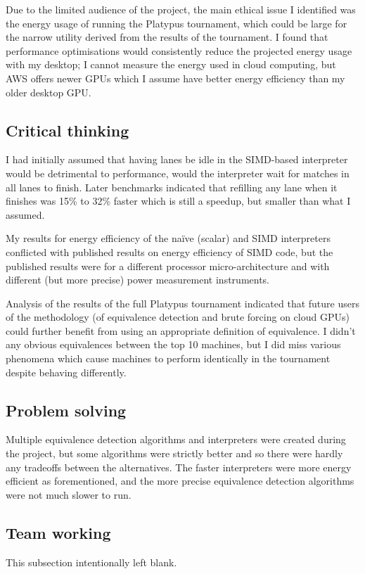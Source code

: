 \documentclass[a4paper]{article}
\begin{document}
Due to the limited audience of the project, the main ethical issue I
identified was the energy usage of running the Platypus tournament,
which could be large for the narrow utility derived from the results of the
tournament. I found that performance optimisations would consistently
reduce the projected energy usage with my desktop; I cannot measure the
energy used in cloud computing, but AWS offers newer GPUs which I assume
have better energy efficiency than my older desktop GPU.

\subsection{Critical thinking}

I had initially assumed that having lanes be idle in the SIMD-based
interpreter would be detrimental to performance, would the interpreter
wait for matches in all lanes to finish. Later benchmarks indicated that
refilling any lane when it finishes was 15\% to 32\% faster which is
still a speedup, but smaller than what I assumed.

My results for energy efficiency of the na\"ive (scalar) and SIMD interpreters
conflicted with published results on energy efficiency of SIMD code, but the
published results were for a different processor micro-architecture and with
different (but more precise) power measurement instruments.

Analysis of the results of the full Platypus tournament indicated that future
users of the methodology (of equivalence detection and brute forcing on cloud
GPUs) could further benefit from using an appropriate definition of
equivalence. I didn't any obvious equivalences between the top 10 machines,
but I did miss various phenomena which cause machines to perform
identically in the tournament despite behaving differently.

\subsection{Problem solving}

Multiple equivalence detection algorithms and interpreters were created
during the project, but some algorithms were strictly better and so there
were hardly any tradeoffs between the alternatives. The faster interpreters
were more energy efficient as forementioned, and the more precise
equivalence detection algorithms were not much slower to run.

\subsection{Team working}

This subsection intentionally left blank.
\end{document}
